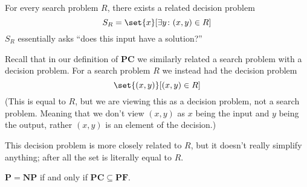 \documentclass[10pt]{article}
\def\PF{\mathbf{PF}}
\def\PC{\mathbf{PC}}
\def\P{\mathbf{P}}
\def\NP{\mathbf{NP}}
\begin{document}


\bigskip

For every search problem $R$, there exists a related decision problem
\[ S_R = \set{x}[\exists y\colon (x,y)\in R] \]
$S_R$ essentially asks ``does this input have a solution?''

\begin{note}

    Recall that in our definition of $\PC$ we similarly related a search problem with a decision problem.
    For a search problem $R$ we instead had the decision problem
    \[ \set{(x,y)}[(x,y)\in R] \]
    (This is equal to $R$, but we are viewing this as a decision problem, not a search problem.
    Meaning that we don't view $(x,y)$ as $x$ being the input and $y$ being the output, rather $(x,y)$ is an element of the decision.)

    This decision problem is more closely related to $R$, but it doesn't really simplify anything; after all the set is literally equal to $R$.

\end{note}

\begin{prop*}

    $\P=\NP$ if and only if $\PC\subseteq\PF$.

\end{prop*}
\end{document}
